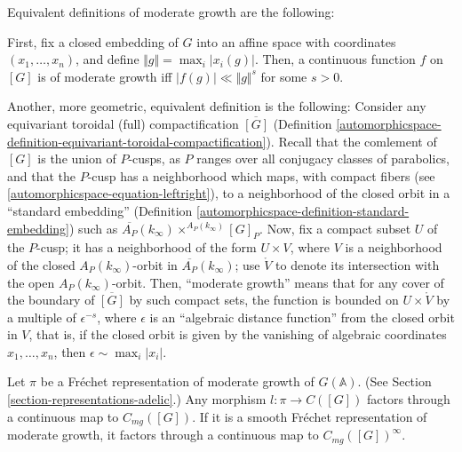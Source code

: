 \begin{remark}
 \label{remark-moderate-growth-definitions}
Equivalent  definitions of moderate growth are the following: 

First, fix a closed embedding of $G$ into an affine space with coordinates $(x_1, \dots, x_n)$, and define $\Vert g\Vert = \max_i |x_i(g)|$. Then, a continuous function $f$ on $[G]$ is of moderate growth iff $|f(g)|\ll \Vert g\Vert^s$ for some $s>0$. 

Another, more geometric, equivalent definition is the following: Consider any equivariant toroidal (full) compactification $\overline{[G]}$ (Definition \ref{automorphicspace-definition-equivariant-toroidal-compactification}). Recall that the comlement of $[G]$ is the union of $P$-cusps, as $P$ ranges over all conjugacy classes of parabolics, and that the $P$-cusp has a neighborhood which maps, with compact fibers (see \eqref{automorphicspace-equation-leftright}), to a neighborhood of the closed orbit in a ``standard embedding'' (Definition \ref{automorphicspace-definition-standard-embedding}) such as $\overline{A_P}(k_\infty) \times^{A_P(k_\infty)} [G]_P$. Now, fix a compact subset $U$ of the $P$-cusp; it has a neighborhood of the form $U\times V$, where $V$ is a neighborhood of the closed $A_P(k_\infty)$-orbit in $\overline{A_P}(k_\infty)$; use $\mathring V$ to denote its intersection with the open $A_P(k_\infty)$-orbit. Then, ``moderate growth'' means that for any cover of the boundary of $\overline{[G]}$ by such compact sets, the function is bounded on $U\times \mathring V$ by a multiple of $\epsilon^{-s}$, where $\epsilon$ is an ``algebraic distance function'' from the closed orbit in $V$, that is, if the closed orbit is given by the vanishing of algebraic coordinates $x_1, \dots, x_n$, then $\epsilon \sim \max_i |x_i|$. 

\end{remark}


\begin{proposition}
 \label{proposition-moderate-growth}
Let $\pi$ be a Fr\'echet representation of moderate growth of $G(\mathbb A)$. (See Section \ref{section-representations-adelic}.) Any morphism $l:\pi\to C([G])$ factors through a continuous map to $C_{mg}([G])$. If it is a smooth Fr\'echet representation of moderate growth, it factors through a continuous map to $C_{mg}([G])^\infty$.
\end{proposition}

